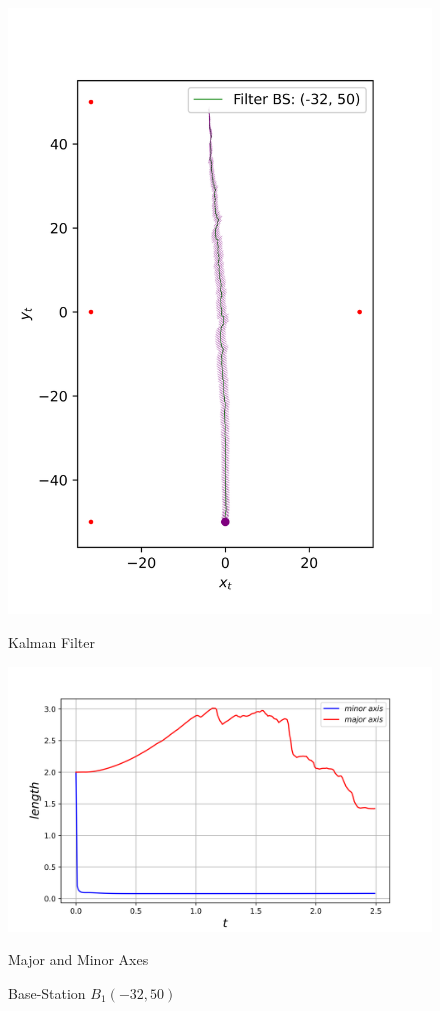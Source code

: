 \begin{figure}[H]
\begin{minipage}{0.49\linewidth}
        \includegraphics[width=\linewidth]{plots/part2-f-0-filter.png}
        \caption*{Kalman Filter}
    \end{minipage}

    \vspace{-0.1cm}
    \begin{minipage}{\linewidth}
        \centering
        \includegraphics[width=\linewidth]{plots/part2-f-0-axes.png}
        \caption*{Major and Minor Axes}
    \end{minipage}

    \caption{Base-Station $B_1(-32, 50)$}
\end{figure}



